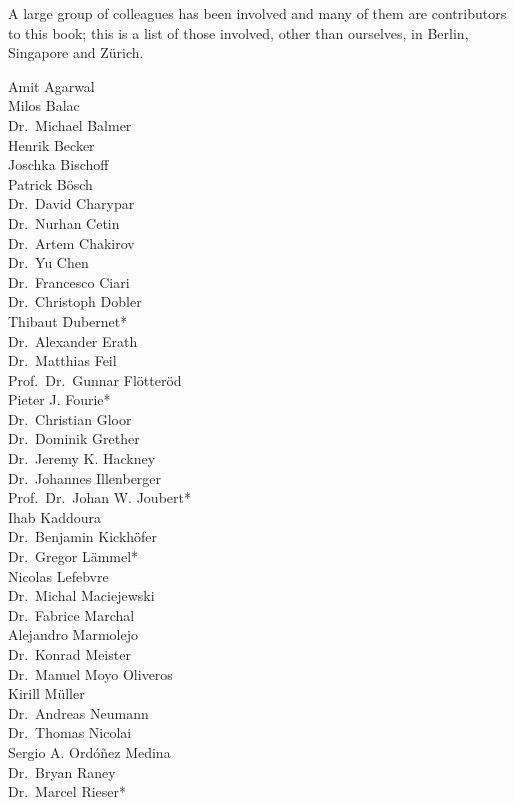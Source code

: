 A large group of colleagues has been involved and many of them are contributors to this book; this is a list of those involved, other than ourselves,
in Berlin, Singapore and Zürich.  
%
\begin{multicols}{3}
Amit Agarwal \\
Milos Balac  \\
Dr.~Michael Balmer \\
Henrik Becker \\
Joschka Bischoff \\
Patrick Bösch \\
Dr.~David Charypar \\
Dr.~Nurhan Cetin  \\
Dr.~Artem Chakirov \\
Dr.~Yu Chen \\
Dr.~Francesco Ciari \\
Dr.~Christoph Dobler \\
Thibaut Dubernet\mbox{*} \\
Dr.~Alexander Erath \\
Dr.~Matthias Feil \\
Prof.~Dr.~Gunnar Flötteröd \\
Pieter J. Fourie\mbox{*} \\
Dr.~Christian Gloor \\
Dr.~Dominik Grether \\
Dr.~Jeremy K. Hackney \\
Dr.~Johannes Illenberger \\
Prof.~Dr.~Johan W. Joubert\mbox{*} \\
Ihab Kaddoura \\
Dr.~Benjamin Kickhöfer \\
Dr.~Gregor Lämmel\mbox{*} \\
Nicolas Lefebvre \\
Dr.~Michal Maciejewski \\
Dr.~Fabrice Marchal \\
Alejandro Marmolejo \\
Dr.~Konrad Meister \\
Dr.~Manuel Moyo Oliveros \\
Kirill Müller \\
Dr.~Andreas Neumann \\
Dr.~Thomas Nicolai \\
Sergio A. Ordóñez Medina \\
Dr.~Bryan Raney \\
Dr.~Marcel Rieser\mbox{*} \\

\end{multicols}
